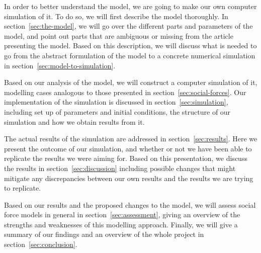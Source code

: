 In order to better understand the model, we are going to make our own computer 
simulation of it. To do so, we will first describe the model thoroughly. In 
section~\ref{sec:the-model}, we will go over the different parts and 
parameters of the model, and point out parts that are ambiguous or missing 
from the article presenting the model. Based on this description, we will 
discuss what is needed to go from the abstract formulation of the model to a 
concrete numerical simulation in section~\ref{sec:model-to-simulation}.

Based on our analysis of the model, we will construct a computer simulation of 
it, modelling cases analogous to those presented in 
section~\ref{sec:social-forces}. Our implementation of the simulation is  
discussed in section~\ref{sec:simulation}, including set up of parameters and 
initial conditions, the structure of our simulation and how we obtain results 
from it.

The actual results of the simulation are addressed in 
section~\ref{sec:results}. Here we present the outcome of our simulation, and 
whether or not we have been able to replicate the results we were aiming for.  
Based on this presentation, we discuss the results in 
section~\ref{sec:discussion} including possible changes that might mitigate 
any discrepancies between our own results and the results we are trying to 
replicate.

Based on our results and the proposed changes to the model, we will assess
social force models in general in section~\ref{sec:assessment}, giving an
overview of the strengths and weaknesses of this modelling approach. Finally,
we will give a summary of our findings and an overview of the whole project in
section~\ref{sec:conclusion}.
